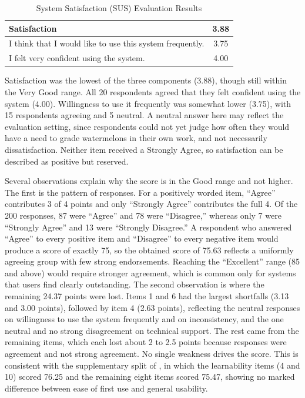 \begin{thesisprose}
\begin{table}[htbp]
\centering
\caption{System Satisfaction (SUS) Evaluation Results}
\label{tab:sus-satisfaction}
\begin{tabularx}{\textwidth}{Xc}
\toprule
\textbf{Satisfaction} & \textbf{3.88} \\
\midrule
I think that I would like to use this system frequently. & 3.75 \\
I felt very confident using the system. & 4.00 \\
\bottomrule
\end{tabularx}
\end{table}

Satisfaction was the lowest of the three components (3.88), though still within the Very Good range. All 20 respondents agreed that they felt confident using the system (4.00). Willingness to use it frequently was somewhat lower (3.75), with 15 respondents agreeing and 5 neutral. A neutral answer here may reflect the evaluation setting, since respondents could not yet judge how often they would have a need to grade watermelons in their own work, and not necessarily dissatisfaction. Neither item received a Strongly Agree, so satisfaction can be described as positive but reserved.

Several observations explain why the score is in the Good range and not higher. The first is the pattern of responses. For a positively worded item, ``Agree'' contributes 3 of 4 points and only ``Strongly Agree'' contributes the full 4. Of the 200 responses, 87 were ``Agree'' and 78 were ``Disagree,'' whereas only 7 were ``Strongly Agree'' and 13 were ``Strongly Disagree.'' A respondent who answered ``Agree'' to every positive item and ``Disagree'' to every negative item would produce a score of exactly 75, so the obtained score of 75.63 reflects a uniformly agreeing group with few strong endorsements. Reaching the ``Excellent'' range (85 and above) would require stronger agreement, which is common only for systems that users find clearly outstanding. The second observation is where the remaining 24.37 points were lost. Items 1 and 6 had the largest shortfalls (3.13 and 3.00 points), followed by item 4 (2.63 points), reflecting the neutral responses on willingness to use the system frequently and on inconsistency, and the one neutral and no strong disagreement on technical support. The rest came from the remaining items, which each lost about 2 to 2.5 points because responses were agreement and not strong agreement. No single weakness drives the score. This is consistent with the supplementary split of \citet{sauro2016}, in which the learnability items (4 and 10) scored 76.25 and the remaining eight items scored 75.47, showing no marked difference between ease of first use and general usability.


\end{thesisprose}

